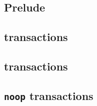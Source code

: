 
\subsection{Prelude                      \lispDone{}}   \label{txn data: processing: sysi: prelude}    
\subsection{\cite{EIP-4788} transactions \lispDone{}}   \label{txn data: processing: sysi: eip 4788}   
\subsection{\cite{EIP-2935} transactions \lispDone{}}   \label{txn data: processing: sysi: eip 2935}   
\subsection{\texttt{noop} transactions   \lispDone{}}   \label{txn data: processing: sysi: noop}       
